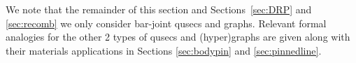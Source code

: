 




%
%







We note that  the remainder of this section and Sections~\ref{sec:DRP} and \ref{sec:recomb} we only consider bar-joint qusecs and graphs. Relevant formal analogies for the other 2 types of qusecs and (hyper)graphs are given along with their materials applications in Sections \ref{sec:bodypin} and \ref{sec:pinnedline}.






